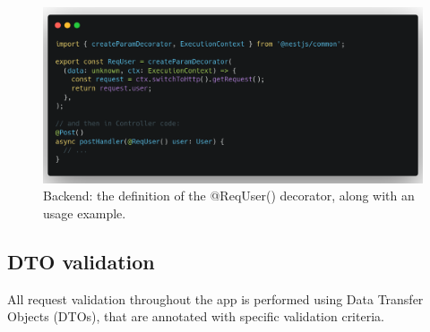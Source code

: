 \begin{figure}[htbp]
    \centering
    \includegraphics[width=1\textwidth]{./figures/code/be_req-user.png}
    \caption{Backend: the definition of the @ReqUser() decorator, along with an usage example.}
    \label{FigBeReqUser}
\end{figure}

\subsection{DTO validation}

All request validation throughout the app is performed using Data Transfer Objects (DTOs), that are annotated with specific validation criteria.